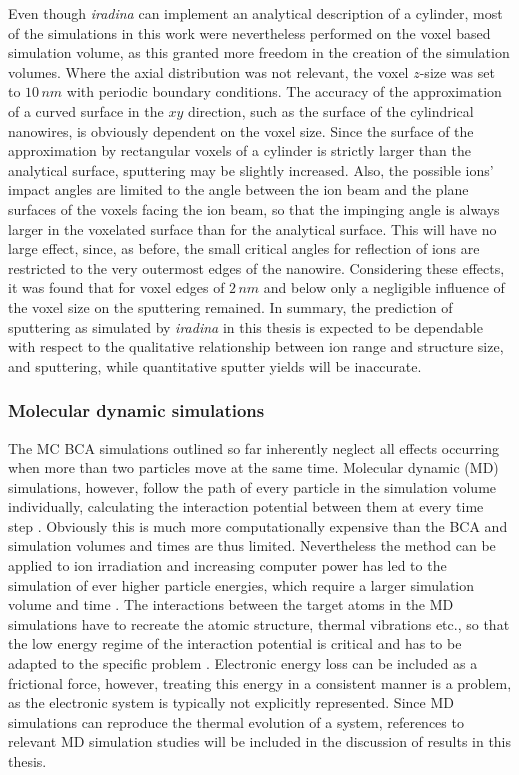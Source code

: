 Even though \emph{iradina} can implement an analytical description of a cylinder, most of the simulations in this work were nevertheless performed on the voxel based simulation volume, as this granted more freedom in the creation of the simulation volumes. Where the axial distribution was not relevant, the voxel $z$-size was set to $10\,nm$ with periodic boundary conditions. The accuracy of the approximation of a curved surface in the $xy$ direction, such as the surface of the cylindrical nanowires, is obviously dependent on the voxel size. Since the surface of the approximation by rectangular voxels of a cylinder is strictly larger than the analytical surface, sputtering may be slightly increased. Also, the possible ions' impact angles are limited to the angle between the ion beam and the plane surfaces of the voxels facing the ion beam, so that the impinging angle is always larger in the voxelated surface than for the analytical surface. This will have no large effect, since, as before, the small critical angles for reflection of ions are restricted to the very outermost edges of the nanowire. Considering these effects, it was found that for voxel edges of $2\,nm$ and below only a negligible influence of the voxel size on the sputtering remained. In summary, the prediction of sputtering as simulated by \emph{iradina} in this thesis is expected to be dependable with respect to the qualitative relationship between ion range and structure size, and sputtering, while quantitative sputter yields will be inaccurate.


\subsubsection{Molecular dynamic simulations}

The MC BCA simulations outlined so far inherently neglect all effects occurring when more than two particles move at the same time. Molecular dynamic (MD) simulations, however, follow the path of every particle in the simulation volume individually, calculating the interaction potential between them at every time step \cite{alder_studies_1959}. Obviously this is much more computationally expensive than the BCA and simulation volumes and times are thus limited. Nevertheless the method can be applied to ion irradiation \cite{nordlund_molecular_1995} and increasing computer power has led to the simulation of ever higher particle energies, which require a larger simulation volume and time \cite{greaves_enhanced_2013,baumer_prediction_2014,anders_sputtering_2015}. The interactions between the target atoms in the MD simulations have to recreate the atomic structure, thermal vibrations etc., so that the low energy regime of the interaction potential is critical and has to be adapted to the specific problem \cite{dedkov_interatomic_1995,nordlund_repulsive_1997,albe_modeling_2002,nordlund_interatomic_2008}. Electronic energy loss can be included as a frictional force, however, treating this energy in a consistent manner is a problem, as the electronic system is typically not explicitly represented. Since MD simulations can reproduce the thermal evolution of a system, references to relevant MD simulation studies will be included in the discussion of results in this thesis.


